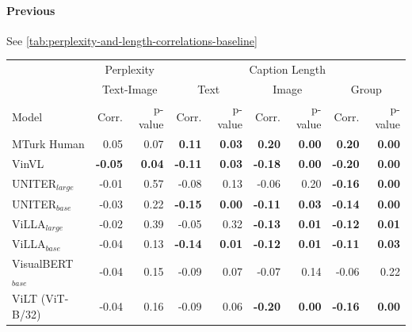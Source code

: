 \paragraph{Previous}

See \cref{tab:perplexity-and-length-correlations-baseline}

\begin{table}[ht]
\centering
\begin{adjustbox}{max width=\textwidth}
\begin{tabular}{l|rr|rrrrrr}
\toprule
 & \multicolumn{2}{c|}{Perplexity} &  \multicolumn{6}{c}{Caption Length}\\
 & \multicolumn{2}{c|}{Text-Image} &  \multicolumn{2}{c}{Text} &  \multicolumn{2}{c}{Image} &  \multicolumn{2}{c}{Group}\\
 Model      &   Corr. &   p-value & Corr. &   p-value & Corr. &   p-value & Corr. &   p-value\\\midrule 
  MTurk Human                  & 0.05           & 0.07          & \textbf{0.11}  & \textbf{0.03} & \textbf{0.20}  & \textbf{0.00} & \textbf{0.20}  & \textbf{0.00} \\
 VinVL                        & \textbf{-0.05} & \textbf{0.04} & \textbf{-0.11} & \textbf{0.03} & \textbf{-0.18} & \textbf{0.00} & \textbf{-0.20} & \textbf{0.00} \\
 UNITER$_{large}$             & -0.01          & 0.57          & -0.08          & 0.13          & -0.06          & 0.20          & \textbf{-0.16} & \textbf{0.00} \\
 UNITER$_{base}$              & -0.03          & 0.22          & \textbf{-0.15} & \textbf{0.00} & \textbf{-0.11} & \textbf{0.03} & \textbf{-0.14} & \textbf{0.00} \\
 ViLLA$_{large}$              & -0.02          & 0.39          & -0.05          & 0.32          & \textbf{-0.13} & \textbf{0.01} & \textbf{-0.12} & \textbf{0.01} \\
 ViLLA$_{base}$               & -0.04          & 0.13          & \textbf{-0.14} & \textbf{0.01} & \textbf{-0.12} & \textbf{0.01} & \textbf{-0.11} & \textbf{0.03} \\
 VisualBERT$_{base}$          & -0.04          & 0.15          & -0.09          & 0.07          & -0.07          & 0.14          & -0.06          & 0.22          \\
 ViLT (ViT-B/32)              & -0.04          & 0.16          & -0.09          & 0.06          & \textbf{-0.20} & \textbf{0.00} & \textbf{-0.16} & \textbf{0.00} \\

\end{tabular}
\end{adjustbox}
\end{table}
